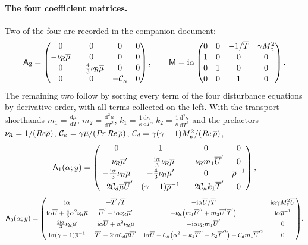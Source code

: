 \documentclass[11pt]{article}
\begin{document}
\paragraph{The four coefficient matrices.} Two of the four are recorded in the companion document:
\begin{equation}\label{eq:A2M}
  \mathsf A_2=\begin{pmatrix}
    0&0&0&0\\[1pt] -\nu_{\!R}\overline{\mu}&0&0&0\\[1pt] 0&-\tfrac43\nu_{\!R}\overline{\mu}&0&0\\[1pt] 0&0&-\mathcal C_\kappa&0
  \end{pmatrix},
  \qquad
  \mathsf M=\mathrm{i}\alpha\begin{pmatrix}
    0&0&-1/\overline{T}&\gamma M_e^2\\[1pt] 1&0&0&0\\[1pt] 0&1&0&0\\[1pt] 0&0&1&0
  \end{pmatrix}.
\end{equation}
The remaining two follow by sorting every term of the four disturbance equations by derivative
order, with all terms collected on the left. With the transport shorthands
$m_1=\tfrac{\mathrm d\mu}{\mathrm dT}$, $m_2=\tfrac{\mathrm d^2\mu}{\mathrm dT^2}$,
$k_1=\tfrac1{\bar\kappa}\tfrac{\mathrm d\kappa}{\mathrm dT}$,
$k_2=\tfrac1{\bar\kappa}\tfrac{\mathrm d^2\kappa}{\mathrm dT^2}$ and the prefactors
$\nu_{\!R}=1/(\mathit{Re}\overline{\rho})$, $\mathcal C_\kappa=\gamma\overline{\mu}/(\mathit{Pr}\,\mathit{Re}\,\overline{\rho})$,
$\mathcal C_d=\gamma(\gamma-1)M_e^2/(\mathit{Re}\,\overline{\rho})$,
\begin{equation}\label{eq:A1}
  \mathsf A_1(\alpha;y)=\begin{pmatrix}
    0 & 1 & 0 & 0\\[2pt]
    -\nu_{\!R}\overline{\mu}' & -\tfrac{\mathrm{i}\alpha}{3}\nu_{\!R}\overline{\mu} & -\nu_{\!R} m_1\overline{U}' & 0\\[2pt]
    -\tfrac{\mathrm{i}\alpha}{3}\nu_{\!R}\overline{\mu} & -\tfrac43\nu_{\!R}\overline{\mu}' & 0 & \overline{\rho}^{-1}\\[2pt]
    -2\mathcal C_d\overline{\mu}\overline{U}' & (\gamma-1)\overline{\rho}^{-1} & -2\mathcal C_\kappa k_1\overline{T}' & 0
  \end{pmatrix},
\end{equation}
\begin{equation}\label{eq:A0}
  \mathsf A_0(\alpha;y)={\small\begin{pmatrix}
    \mathrm{i}\alpha & -\overline{T}'/\overline{T} & -\mathrm{i}\alpha\overline{U}/\overline{T} & \mathrm{i}\alpha\gamma M_e^2\overline{U}\\[3pt]
    \mathrm{i}\alpha\overline{U}+\tfrac43\alpha^2\nu_{\!R}\overline{\mu} & \overline{U}'-\mathrm{i}\alpha\nu_{\!R}\overline{\mu}' &
      -\nu_{\!R}\big(m_1\overline{U}''+m_2\overline{U}'\overline{T}'\big) & \mathrm{i}\alpha\overline{\rho}^{-1}\\[3pt]
    \tfrac{2\mathrm{i}\alpha}{3}\nu_{\!R}\overline{\mu}' & \mathrm{i}\alpha\overline{U}+\alpha^2\nu_{\!R}\overline{\mu} &
      -\mathrm{i}\alpha\nu_{\!R} m_1\overline{U}' & 0\\[3pt]
    \mathrm{i}\alpha(\gamma-1)\overline{\rho}^{-1} & \overline{T}'-2\mathrm{i}\alpha\mathcal C_d\overline{\mu}\overline{U}' &
      \mathrm{i}\alpha\overline{U}+\mathcal C_\kappa\big(\alpha^2-k_1\overline{T}''-k_2\overline{T}'^2\big)
      -\mathcal C_d m_1\overline{U}'^2 & 0
  \end{pmatrix}}.
\end{equation}
\end{document}
